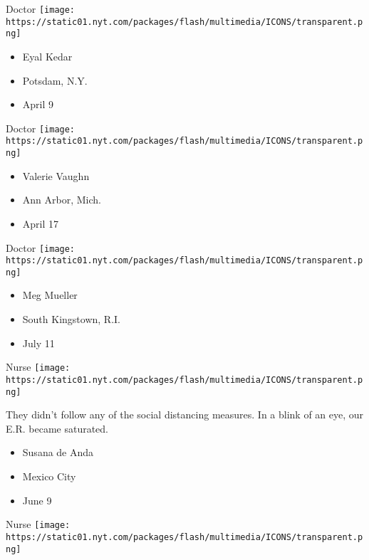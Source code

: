\protect\hyperlink{item-eyal-kedar}{}

Doctor
\texttt{[image: https://static01.nyt.com/packages/flash/multimedia/ICONS/transparent.png]}

\begin{itemize}
\tightlist
\item
  Eyal Kedar
\item
  Potsdam, N.Y.
\item
  April 9
\end{itemize}

\protect\hyperlink{item-valerie-vaughn}{}

Doctor
\texttt{[image: https://static01.nyt.com/packages/flash/multimedia/ICONS/transparent.png]}

\begin{itemize}
\tightlist
\item
  Valerie Vaughn
\item
  Ann Arbor, Mich.
\item
  April 17
\end{itemize}

\protect\hyperlink{item-meg-mueller}{}

Doctor
\texttt{[image: https://static01.nyt.com/packages/flash/multimedia/ICONS/transparent.png]}

\begin{itemize}
\tightlist
\item
  Meg Mueller
\item
  South Kingstown, R.I.
\item
  July 11
\end{itemize}

\protect\hyperlink{item-susana-de-anda}{}

Nurse
\texttt{[image: https://static01.nyt.com/packages/flash/multimedia/ICONS/transparent.png]}

They didn't follow any of the social distancing measures. In a blink of
an eye, our E.R. became saturated.

\begin{itemize}
\tightlist
\item
  Susana de Anda
\item
  Mexico City
\item
  June 9
\end{itemize}

\protect\hyperlink{item-amanda-ramalho}{}

Nurse
\texttt{[image: https://static01.nyt.com/packages/flash/multimedia/ICONS/transparent.png]}


